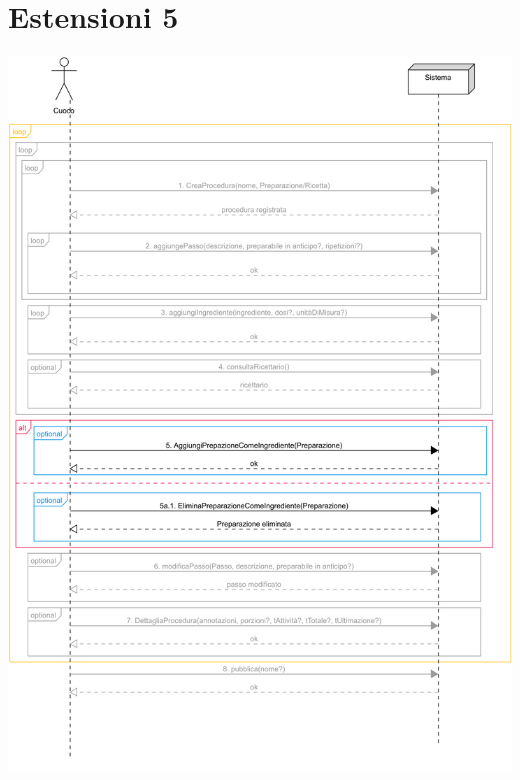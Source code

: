 \section*{Estensioni 5}
\begin{center}
  \includegraphics[max width=\textwidth, max height=190mm]{../resources/img/GRP/SSD/ext5.png}
\end{center}

